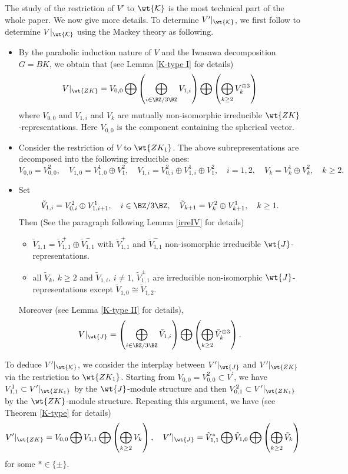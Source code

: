 \documentclass[11pt,reqno]{amsart}
\newcommand{\CK}{{\mathcal {K}}} \newcommand{\CL}{{\mathcal {L}}}
\theoremstyle{plain}
\theoremstyle{remark} \newtheorem{remark}[thm]{Remark}
\theoremstyle{definition} \newtheorem{exercise}[thm]{Exercise}
\theoremstyle{definition} \newtheorem{example}[thm]{Example} \newtheorem{condition}[thm]{Condition}
\numberwithin{equation}{section}
\renewcommand{\-}{\text{--}}
\begin{document}
 The study of the restriction of $V'$ to $\wt{\CK}$ is the most technical part of the whole paper. We now give more details. 
To determine $V^\prime|_{\wt{\CK}}$,  we first follow  \cite{Cas73} to determine $V|_{\wt{\CK}}$ using the Mackey theory as following.
\begin{itemize}
\item By the parabolic induction nature of $V$ and the Iwasawa decomposition $G=BK$, we obtain that (see Lemma \ref{K-type I} for details)  \[V|_{\wt{ZK}}=V_{0,0}\bigoplus\left(\bigoplus_{i\in\BZ/3\BZ}V_{1,i}\right)\bigoplus \left(\bigoplus_{k\geq2}V_{k}^{\oplus 3}\right)\]
where $V_{0,0}$ and $V_{1,i}$ and $V_{k}$ are mutually non-isomorphic irreducible $\wt{ZK}$-representations. Here $V_{0,0}$ is the  component containing the spherical vector.
\item Consider the  restriction of $V$ to $\wt{ZK_1}$.  The above subrepresentations are decomposed into the following irreducible ones: 
\[V_{0,0}= V_{0,0}^2,\quad V_{1,0}=V_{1,0}^1\oplus V_{1}^2,\quad
V_{1,i}=V_{0,i}^2\oplus V_{1,i}^1\oplus V_{1}^2, \quad  i=1,2, \quad 
V_{k}=V_{k}^1\oplus V_{k}^2,\quad k\geq2.\]
\item Set 
\[\tilde{V}_{1,i}=V_{0,i}^2\oplus V_{1,i+1}^1, \quad i\in\BZ/3\BZ, \quad  \tilde{V}_{k+1}=V_{k}^2\oplus V_{k+1}^1, \quad k\geq1.\] 
Then (See the paragraph following Lemma \ref{irreIV} for details) \begin{itemize}
    \item $\tilde{V}_{1,1}=\tilde{V}_{1,1}^+\oplus \tilde{V}_{1,1}^-$ with  $\tilde{V}_{1,1}^+$ and $ \tilde{V}_{1,1}^-$ non-isomorphic irreducible $\wt{J}$-representations.
    \item all  $\tilde{V}_{k}$, $k\geq 2$ and $\tilde{V}_{1,i}$, $i\neq 1$, $\tilde{V}_{1,1}^\pm$ are irreducible non-isomorphic $\wt{J}$-representations except $\tilde{V}_{1,0}\cong \tilde{V}_{1,2}$.
\end{itemize}   
Moreover (see Lemma \ref{K-type II} for details), 
\[V|_{\wt{J}}=\left(\bigoplus_{i \in \BZ/3\BZ} \tilde{V}_{1,i}\right)\bigoplus \left(\bigoplus_{k\geq2}\tilde{V}_k^{\oplus 3}\right).\]  
\end{itemize}

To deduce $V^\prime|_{\wt{\CK}}$, we consider the interplay between  $V^\prime|_{\wt{J}}$ and $V^\prime|_{\wt{ZK}}$ via the restriction to $\wt{ZK_1}$. Starting from $V_{0,0}=V_{0,0}^2\subset V^\prime$, we have $V_{1,1}^1\subset V^\prime|_{\wt{ZK_1}}$ by the $\wt{J}$-module structure and then $V_{0,1}^2\subset V^\prime|_{\wt{ZK_1}}$
by the $\wt{ZK}$-module structure. Repeating this argument, we have (see Theorem \ref{K-type} for details)
\[V^\prime|_{\wt{ZK}}=V_{0,0}\bigoplus V_{1,1}\bigoplus\left(\bigoplus_{k\geq 2}V_k \right), \quad V^\prime|_{\wt{J}}=\tilde{V}_{1,1}^*\bigoplus \tilde{V}_{1,0}\bigoplus \left(\bigoplus_{k\geq2}\tilde{V}_k\right)\]
for some $*\in\{\pm\}$.
\end{document}
